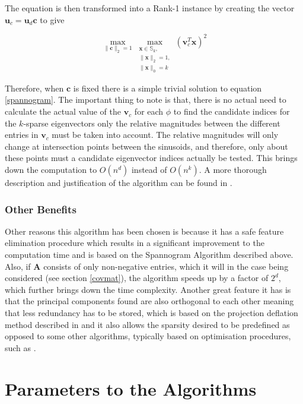 \documentclass[11pt,a4paper]{article}
\begin{document}
The equation is then transformed into a Rank-1 instance by creating the vector $\mathbf{u}_c = \mathbf{u}_d \mathbf{c}$ to give 

\begin{equation}
\max_{\|\mathbf{c}\|_2 =1} \max_{\substack{\mathbf{x} \in\mathbb{S}_k, \\ \|\mathbf{x}\|_2 = 1, \\ \|\mathbf{x}\|_0 = k}}\left(\mathbf{v}_c^T \mathbf{x}\right)^2 
\label{spannogram}
\end{equation}

Therefore, when $\mathbf{c}$ is fixed there is a simple trivial solution to  equation \ref{spannogram}. The important thing to note is that, there is no actual need to calculate the actual value of the $\mathbf{v}_c$ for each $\phi$ to find the candidate indices for the $k$-sparse eigenvectors only the relative magnitudes between the different entries in  $\mathbf{v}_c$ must be taken into account. The relative magnitudes will only change at intersection points between the sinusoids, and therefore, only about these points must a candidate eigenvector indices actually be tested. This brings down the computation to $O \left(n^d\right)$ instead of $O \left(n^k\right)$. A more thorough description and justification of the algorithm can be found in \cite{dimakis}.

\subsubsection{Other Benefits}
Other reasons this algorithm has been chosen is because it has a safe feature elimination procedure which results in a significant improvement to the computation time and is based on the Spannogram Algorithm described above. Also, if $\mathbf{A}$ consists of only non-negative entries, which it will in the case being considered (see section \ref{covmat}), the algorithm speeds up by a factor of $2^d$, which further brings down the time complexity. Another great feature it has is that the principal components found are also orthogonal to each other meaning that less redundancy has to be stored, which is based on the projection deflation method described in \cite{Mackey_deflationmethods} and it also allows the sparsity desired to be predefined as opposed to some other algorithms, typically based on optimisation procedures, such as \cite{GPower}.
\clearpage

\section{Parameters to the Algorithms}
\end{document}
